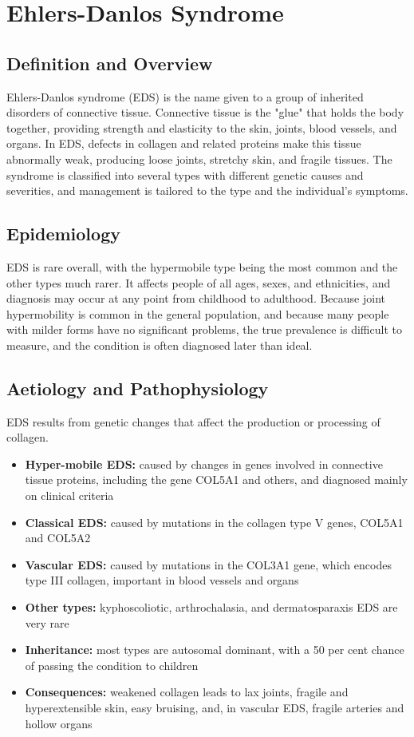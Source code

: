 \chapter{Ehlers-Danlos Syndrome}

\section*{Definition and Overview}
Ehlers-Danlos syndrome (EDS) is the name given to a group of inherited disorders of connective tissue. Connective tissue is the "glue" that holds the body together, providing strength and elasticity to the skin, joints, blood vessels, and organs. In EDS, defects in collagen and related proteins make this tissue abnormally weak, producing loose joints, stretchy skin, and fragile tissues. The syndrome is classified into several types with different genetic causes and severities, and management is tailored to the type and the individual's symptoms.

\section*{Epidemiology}
EDS is rare overall, with the hypermobile type being the most common and the other types much rarer. It affects people of all ages, sexes, and ethnicities, and diagnosis may occur at any point from childhood to adulthood. Because joint hypermobility is common in the general population, and because many people with milder forms have no significant problems, the true prevalence is difficult to measure, and the condition is often diagnosed later than ideal.

\section*{Aetiology and Pathophysiology}
EDS results from genetic changes that affect the production or processing of collagen.
\begin{itemize}
    \item \textbf{Hyper-mobile EDS:} caused by changes in genes involved in connective tissue proteins, including the gene COL5A1 and others, and diagnosed mainly on clinical criteria
    \item \textbf{Classical EDS:} caused by mutations in the collagen type V genes, COL5A1 and COL5A2
    \item \textbf{Vascular EDS:} caused by mutations in the COL3A1 gene, which encodes type III collagen, important in blood vessels and organs
    \item \textbf{Other types:} kyphoscoliotic, arthrochalasia, and dermatosparaxis EDS are very rare
    \item \textbf{Inheritance:} most types are autosomal dominant, with a 50 per cent chance of passing the condition to children
    \item \textbf{Consequences:} weakened collagen leads to lax joints, fragile and hyperextensible skin, easy bruising, and, in vascular EDS, fragile arteries and hollow organs
\end{itemize}

